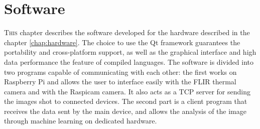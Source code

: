 \chapter{Software}
\label{chap:software}
%
\lettrine[lines=3]{T}{his} chapter describes the software developed for the
hardware described in the chapter \ref{chap:hardware}. The choice to use the Qt
framework guarantees the portability and cross-platform support, as well
as the graphical interface and high data performance the feature of compiled
languages.  The software is divided into two programs capable of communicating
with each other: the first works on Raspberry Pi and allows the user to
interface easily with the FLIR thermal camera and with the Raspicam camera. It
also acts as a TCP server for sending the images shot to connected devices. The
second part is a client program that receives the data sent by the main device,
and allows the analysis of the image through machine learning on dedicated
hardware.
%



